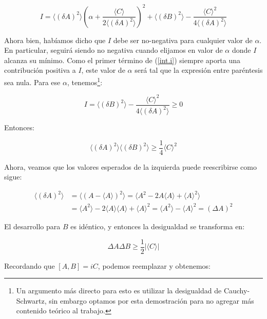 \begin{equation}\label{int.i}
    I=\langle(\delta A)^2\rangle \left( \alpha + \frac{\langle C \rangle}{2\langle(\delta A)^2\rangle}\right)^2+\langle(\delta B)^2\rangle - \frac{\langle C \rangle^2}{4\langle(\delta A)^2\rangle}
\end{equation}

Ahora bien, habíamos dicho que $I$ debe ser no-negativa para cualquier valor de $\alpha$. En particular, seguirá siendo no negativa cuando elijamos en valor de $\alpha$ donde $I$ alcanza su mínimo. Como el primer término de (\ref{int.i}) siempre aporta una contribución positiva a $I$, este valor de $\alpha$ será tal que la expresión entre paréntesis sea nula. Para ese $\alpha$, tenemos\footnote{Un argumento más directo para esto es utilizar la desigualdad de Cauchy-Schwartz, sin embargo optamos por esta demostración para no agregar más contenido teórico al trabajo.}:

\begin{equation}
    I=\langle(\delta B)^2\rangle-\frac{\langle C \rangle^2}{4\langle(\delta A)^2\rangle}\geq 0
\end{equation}

Entonces:

\begin{equation}
    \langle(\delta A)^2\rangle\langle(\delta B)^2\rangle\geq \frac{1}{4}\langle C \rangle^2
\end{equation}

Ahora, veamos que los valores esperados de la izquierda puede reescribirse como sigue:

\begin{equation}
\begin{split}
     \langle(\delta A)^2\rangle &=\langle(A- \langle A\rangle)^2\rangle=\langle A^2 - 2 A \langle A \rangle + \langle A \rangle^2 \rangle   \\ 
     &= \langle A^2\rangle - 2\langle A\rangle\langle A\rangle+ \langle A\rangle^2 = \langle A^2\rangle -\langle A\rangle^2=(\Delta A)^2
\end{split}
\end{equation}

El desarrollo para $B$ es idéntico, y entonces la desigualdad se transforma en:

\begin{equation}
    \Delta A \Delta B \geq \frac{1}{2}|\langle C \rangle|
\end{equation}

Recordando que $\left[A,B\right]=iC$, podemos reemplazar y obtenemos:

